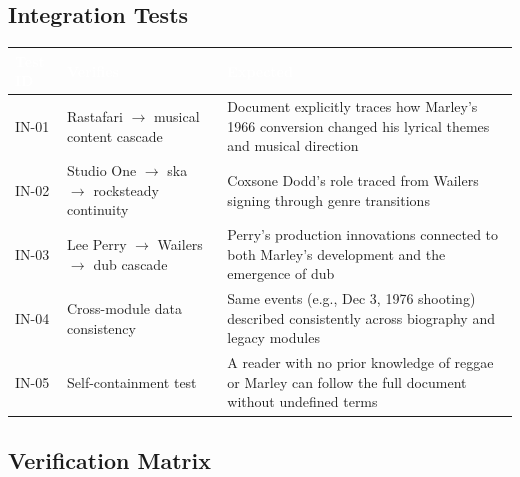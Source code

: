 \documentclass[11pt,letterpaper]{article}
\newcommand{\tableheader}[1]{\textbf{\sffamily\textcolor{white}{#1}}}
\begin{document}
\subsection{Integration Tests}

\begin{center}
\begin{tabularx}{\textwidth}{C{1.5cm}L{4.5cm}X}
\toprule
{}
\tableheader{Test ID} & \tableheader{Verifies} & \tableheader{Expected} \\
\midrule
IN-01 & Rastafari $\rightarrow$ musical content cascade & Document explicitly traces how Marley's 1966 conversion changed his lyrical themes and musical direction \\
IN-02 & Studio One $\rightarrow$ ska $\rightarrow$ rocksteady continuity & Coxsone Dodd's role traced from Wailers signing through genre transitions \\
IN-03 & Lee Perry $\rightarrow$ Wailers $\rightarrow$ dub cascade & Perry's production innovations connected to both Marley's development and the emergence of dub \\
IN-04 & Cross-module data consistency & Same events (e.g., Dec 3, 1976 shooting) described consistently across biography and legacy modules \\
IN-05 & Self-containment test & A reader with no prior knowledge of reggae or Marley can follow the full document without undefined terms \\
\bottomrule
\end{tabularx}
\end{center}

\subsection{Verification Matrix}
\end{document}

